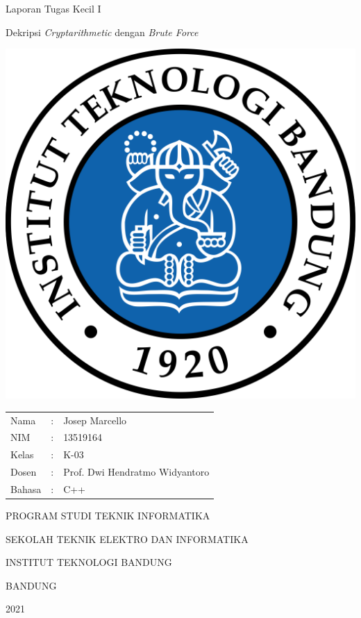 \documentclass{article}
\begin{document}
\begin{titlepage}
  \centering
  \Large Laporan Tugas Kecil I

  \large Dekripsi \textit{Cryptarithmetic} dengan \textit{Brute Force}

  \normalsize


  \includegraphics[scale=0.2]{logo-itb.png}

  \begin{tabular}{lll}
    Nama  &: & Josep Marcello \\
    NIM &: & 13519164 \\
    Kelas &: & K-03 \\
    Dosen &: & Prof. Dwi Hendratmo Widyantoro \\
    Bahasa &: & C++ \\
  \end{tabular}

  \large
  PROGRAM STUDI TEKNIK INFORMATIKA

  SEKOLAH TEKNIK ELEKTRO DAN INFORMATIKA

  INSTITUT TEKNOLOGI BANDUNG

  BANDUNG

  2021

\end{titlepage}
\end{document}
